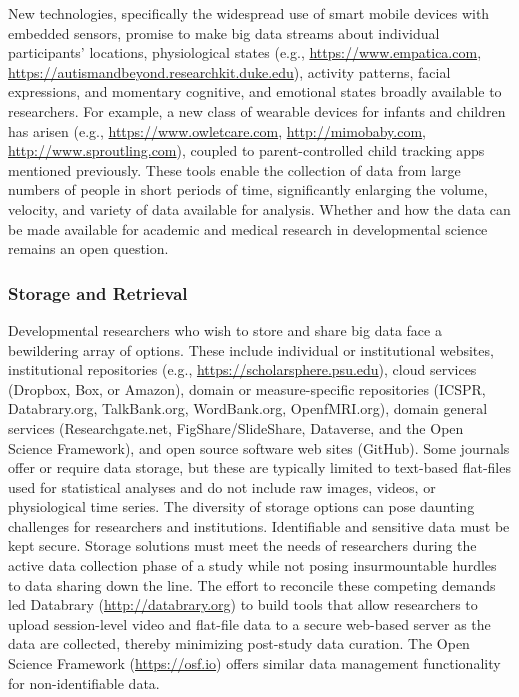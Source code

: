 \documentclass[letterpaper,man,apacite,natbib]{apa6}
\begin{document}
New technologies, specifically the widespread use of smart mobile devices with embedded sensors, promise to make big data streams about individual participants' locations, physiological states (e.g., \url{https://www.empatica.com}, \url{https://autismandbeyond.researchkit.duke.edu}), activity patterns, facial expressions, and momentary cognitive, and emotional states broadly available to researchers.
For example, a new class of wearable devices for infants and children has arisen (e.g., \url{https://www.owletcare.com}, \url{http://mimobaby.com}, \url{http://www.sproutling.com}), coupled to parent-controlled child tracking apps mentioned previously.
These tools enable the collection of data from large numbers of people in short periods of time, significantly enlarging the volume, velocity, and variety of data available for analysis.
Whether and how the data can be made available for academic and medical research in developmental science remains an open question.

\subsubsection{Storage and Retrieval}
Developmental researchers who wish to store and share big data face a bewildering array of options.
These include individual or institutional websites, institutional repositories (e.g., \url{https://scholarsphere.psu.edu}), cloud services (Dropbox, Box, or Amazon), domain or measure-specific repositories (ICSPR, Databrary.org, TalkBank.org, WordBank.org, OpenfMRI.org), domain general services (Researchgate.net, FigShare/SlideShare, Dataverse, and the Open Science Framework), and open source software web sites (GitHub).
Some journals offer or require data storage, but these are typically limited to text-based flat-files used for statistical analyses and do not include raw images, videos, or physiological time series.
The diversity of storage options can pose daunting challenges for researchers and institutions.
Identifiable and sensitive data must be kept secure.
Storage solutions must meet the needs of researchers during the active data collection phase of a study while not posing insurmountable hurdles to data sharing down the line.
The effort to reconcile these competing demands led Databrary (\url{http://databrary.org}) to build tools that allow researchers to upload session-level video and flat-file data to a secure web-based server as the data are collected, thereby minimizing post-study data curation.
The Open Science Framework (\url{https://osf.io}) offers similar data management functionality for non-identifiable data.
\end{document}
